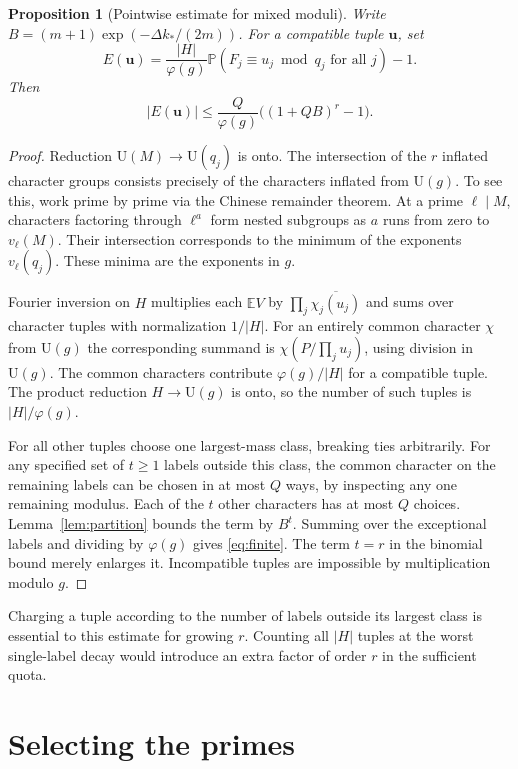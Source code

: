 \documentclass[11pt]{article}
\newtheorem{proposition}[theorem]{Proposition}
\newcommand{\U}{\mathrm U}
\newcommand{\E}{\mathbb E}
\newcommand{\PP}{\mathbb P}
\newcommand{\ph}{\varphi}
\begin{document}
\begin{proposition}[Pointwise estimate for mixed moduli]\label{prop:finite}
Write $B=(m+1)\exp(-\Delta k_*/(2m))$. For a compatible tuple $\mathbf u$, set
\[
 E(\mathbf u)=\frac{|H|}{\ph(g)}\PP(F_j\equiv u_j\bmod q_j\text{ for all }j)-1 .
\]
Then
\begin{equation}\label{eq:finite}
 |E(\mathbf u)|\le\frac{Q}{\ph(g)}\bigl((1+QB)^r-1\bigr).
\end{equation}
\end{proposition}
\begin{proof}
Reduction $\U(M)\to\U(q_j)$ is onto. The intersection of the $r$ inflated character groups consists precisely of the characters inflated from $\U(g)$. To see this, work prime by prime via the Chinese remainder theorem. At a prime $\ell\mid M$, characters factoring through $\ell^a$ form nested subgroups as $a$ runs from zero to $v_\ell(M)$. Their intersection corresponds to the minimum of the exponents $v_\ell(q_j)$. These minima are the exponents in $g$.

Fourier inversion on $H$ multiplies each $\E V$ by $\prod_j\overline{\chi_j(u_j)}$ and sums over character tuples with normalization $1/|H|$. For an entirely common character $\chi$ from $\U(g)$ the corresponding summand is $\chi(P/\prod_j u_j)$, using division in $\U(g)$. The common characters contribute $\ph(g)/|H|$ for a compatible tuple. The product reduction $H\to\U(g)$ is onto, so the number of such tuples is $|H|/\ph(g)$.

For all other tuples choose one largest-mass class, breaking ties arbitrarily. For any specified set of $t\ge1$ labels outside this class, the common character on the remaining labels can be chosen in at most $Q$ ways, by inspecting any one remaining modulus. Each of the $t$ other characters has at most $Q$ choices. Lemma~\ref{lem:partition} bounds the term by $B^t$. Summing over the exceptional labels and dividing by $\ph(g)$ gives \eqref{eq:finite}. The term $t=r$ in the binomial bound merely enlarges it. Incompatible tuples are impossible by multiplication modulo $g$.
\end{proof}

Charging a tuple according to the number of labels outside its largest class is essential to this estimate for growing $r$. Counting all $|H|$ tuples at the worst single-label decay would introduce an extra factor of order $r$ in the sufficient quota.

\section{Selecting the primes}\label{sec:selection}
\end{document}
